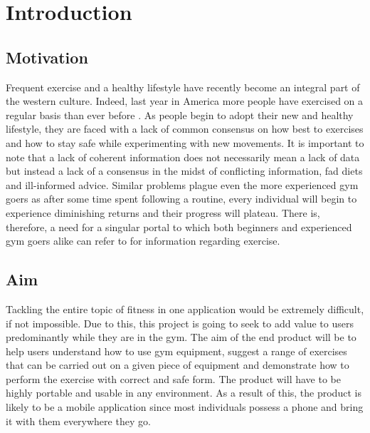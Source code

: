 \documentclass{l4proj}
\begin{document}
\chapter{Introduction}
\section{Motivation}
Frequent exercise and a healthy lifestyle have recently become an integral part of the western culture. Indeed, last year in America more people have exercised on a regular basis than ever before \cite{riffkin_so_2015}. As people begin to adopt their new and healthy lifestyle, they are faced with a lack of common consensus on how best to exercises and how to stay safe while experimenting with new movements. It is important to note that a lack of coherent information does not necessarily mean a lack of data but instead a lack of a consensus in the midst of conflicting information, fad diets and ill-informed advice. Similar problems plague even the more experienced gym goers as after some time spent following a routine, every individual will begin to experience diminishing returns and their progress will plateau. There is, therefore, a need for a singular portal to which both beginners and experienced gym goers alike can refer to for information regarding exercise.  

\section{Aim} \label{sec:aim}
Tackling the entire topic of fitness in one application would be extremely difficult, if not impossible. Due to this, this project is going to seek to add value to users predominantly while they are in the gym. The aim of the end product will be to help users understand how to use gym equipment, suggest a range of exercises that can be carried out on a given piece of equipment and demonstrate how to perform the exercise with correct and safe form. The product will have to be highly portable and usable in any environment. As a result of this, the product is likely to be a mobile application since most individuals possess a phone and bring it with them everywhere they go.
\end{document}

